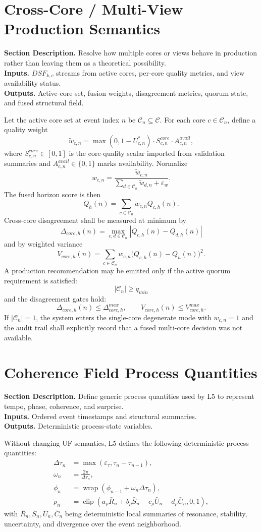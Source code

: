 \documentclass[11pt]{report}
\newcommand{\clip}{\operatorname{clip}}
\newcommand{\wrap}{\operatorname{wrap}}
\newcommand{\meta}[3]{\textbf{Section Description.} #1\\
\textbf{Inputs.} #2\\
\textbf{Outputs.} #3\par}
\begin{document}
\section{Cross-Core / Multi-View Production Semantics}
\meta{Resolve how multiple cores or views behave in production rather than leaving them as a theoretical possibility.}{$DSF_{k,c}$ streams from active cores, per-core quality metrics, and view availability status.}{Active-core set, fusion weights, disagreement metrics, quorum state, and fused structural field.}

Let the active core set at event index $n$ be $\mathcal{C}_n\subseteq\mathcal{C}$. For each core $c\in\mathcal{C}_n$, define a quality weight
\[
\tilde w_{c,n}=\max(0,1-U^{\ast}_{c,n})\cdot S^{core}_{c,n}\cdot A^{avail}_{c,n},
\]
where $S^{core}_{c,n}\in[0,1]$ is the core-quality scalar imported from validation summaries and $A^{avail}_{c,n}\in\{0,1\}$ marks availability. Normalize
\[
w_{c,n}=\frac{\tilde w_{c,n}}{\sum_{d\in\mathcal{C}_n}\tilde w_{d,n}+\varepsilon_w}.
\]
The fused horizon score is then
\[
Q_h(n)=\sum_{c\in\mathcal{C}_n} w_{c,n}Q_{c,h}(n).
\]
Cross-core disagreement shall be measured at minimum by
\[
\Delta_{core,h}(n)=\max_{c,d\in\mathcal{C}_n}|Q_{c,h}(n)-Q_{d,h}(n)|
\]
and by weighted variance
\[
V_{core,h}(n)=\sum_{c\in\mathcal{C}_n}w_{c,n}\big(Q_{c,h}(n)-Q_h(n)\big)^2.
\]
A production recommendation may be emitted only if the active quorum requirement is satisfied:
\[
|\mathcal{C}_n|\ge q_{min}
\]
and the disagreement gates hold:
\[
\Delta_{core,h}(n)\le \Delta_{core,h}^{max},\qquad V_{core,h}(n)\le V_{core,h}^{max}.
\]
If $|\mathcal{C}_n|=1$, the system enters the single-core degenerate mode with $w_{c,n}=1$ and the audit trail shall explicitly record that a fused multi-core decision was not available.

\section{Coherence Field Process Quantities}
\meta{Define generic process quantities used by L5 to represent tempo, phase, coherence, and surprise.}{Ordered event timestamps and structural summaries.}{Deterministic process-state variables.}

Without changing UF semantics, L5 defines the following deterministic process quantities:
\begin{align*}
\Delta\tau_n &= \max(\varepsilon_\tau,\tau_n-\tau_{n-1}),\\
\omega_n &= \frac{2\pi}{\Delta\tau_n},\\
\phi_n &= \wrap(\phi_{n-1}+\omega_n\Delta\tau_n),\\
\rho_n &= \clip\left(a_\rho\bar R_n+b_\rho\bar S_n-c_\rho\bar U_n-d_\rho\bar C_n,0,1\right),
\end{align*}
with $\bar R_n,\bar S_n,\bar U_n,\bar C_n$ being deterministic local summaries of resonance, stability, uncertainty, and divergence over the event neighborhood.
\end{document}
